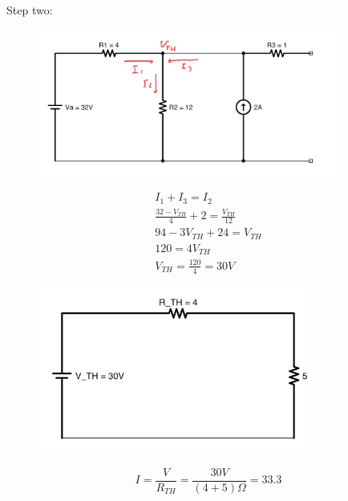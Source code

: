 \documentclass[a4paper,12]{article}
\begin{document}
Step two:
\begin{figure}[H]
    \centering
    \includegraphics[width=100mm]{Image/16.jpg}
\end{figure}
\begin{gather}
    I_1+I_3=I_2\\
    \frac{32-V_{TH}}{4}+2=\frac{V_{TH}}{12}\\
    94-3V_{TH}+24=V_{TH}\\
    120=4V_{TH}\\
    V_{TH}=\frac{120}{4}=30V
\end{gather}
\begin{figure}[H]
    \centering
    \includegraphics[width=90mm]{Image/17.jpg}
\end{figure}
\[I=\frac{V}{R_{TH}}=\frac{30V}{(4+5)\Omega}=33.3\]
\end{document}
